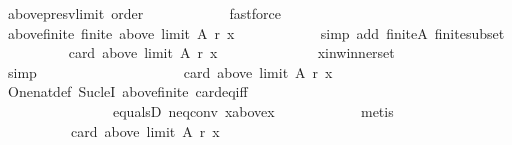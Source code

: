 \begin{isabellebody}
\ above{\isacharunderscore}{\kern0pt}presv{\isacharunderscore}{\kern0pt}limit\ order\isanewline
\ \ \ \ \ \ \ \ \ \ \isamarkupfalse%
\ fastforce\isanewline
\ \ \ \ \ \ \ \ \isamarkupfalse%
\ above{\isacharunderscore}{\kern0pt}finite{\isacharcolon}{\kern0pt}\ {\isachardoublequoteopen}finite\ {\isacharparenleft}{\kern0pt}above\ {\isacharparenleft}{\kern0pt}limit\ A\ r{\isacharparenright}{\kern0pt}\ x{\isacharparenright}{\kern0pt}{\isachardoublequoteclose}\isanewline
\ \ \ \ \ \ \ \ \ \ \isamarkupfalse%
\ {\isacharparenleft}{\kern0pt}simp\ add{\isacharcolon}{\kern0pt}\ finite{\isacharunderscore}{\kern0pt}A\ finite{\isacharunderscore}{\kern0pt}subset{\isacharparenright}{\kern0pt}\isanewline
\ \ \ \ \ \ \ \ \isamarkupfalse%
\ {\isachardoublequoteopen}card\ {\isacharparenleft}{\kern0pt}above\ {\isacharparenleft}{\kern0pt}limit\ A\ r{\isacharparenright}{\kern0pt}\ x{\isacharparenright}{\kern0pt}\ {\isasymle}\ {}{\isachardoublequoteclose}\isanewline
\ \ \ \ \ \ \ \ \ \ \isamarkupfalse%
\ x{\isacharunderscore}{\kern0pt}in{\isacharunderscore}{\kern0pt}winner{\isacharunderscore}{\kern0pt}set\isanewline
\ \ \ \ \ \ \ \ \ \ \isamarkupfalse%
\ simp\isanewline
\ \ \ \ \ \ \ \ \isamarkupfalse%
\ \isamarkupfalse%
\isanewline
\ \ \ \ \ \ \ \ \ \ {\isachardoublequoteopen}card\ {\isacharparenleft}{\kern0pt}above\ {\isacharparenleft}{\kern0pt}limit\ A\ r{\isacharparenright}{\kern0pt}\ x{\isacharparenright}{\kern0pt}\ {\isasymge}\ {}{\isachardoublequoteclose}\isanewline
\ \ \ \ \ \ \ \ \ \ \isamarkupfalse%
\ One{\isacharunderscore}{\kern0pt}nat{\isacharunderscore}{\kern0pt}def\ Suc{\isacharunderscore}{\kern0pt}leI\ above{\isacharunderscore}{\kern0pt}finite\ card{\isacharunderscore}{\kern0pt}eq{\isacharunderscore}{\kern0pt}{}{\isacharunderscore}{\kern0pt}iff\isanewline
\ \ \ \ \ \ \ \ \ \ \ \ \ \ \ \ equals{}D\ neq{}{\isacharunderscore}{\kern0pt}conv\ x{\isacharunderscore}{\kern0pt}above{\isacharunderscore}{\kern0pt}x\isanewline
\ \ \ \ \ \ \ \ \ \ \isamarkupfalse%
\ metis\isanewline
\ \ \ \ \ \ \ \ \isamarkupfalse%
\ \isamarkupfalse%
\isanewline
\ \ \ \ \ \ \ \ \ \ {\isachardoublequoteopen}card\ {\isacharparenleft}{\kern0pt}above\ {\isacharparenleft}{\kern0pt}limit\ A\ r{\isacharparenright}{\kern0pt}\ x{\isacharparenright}{\kern0pt}\ {\isacharequal}{\kern0pt}\ {}{\isachardoublequoteclose}\isanewline

\end{isabellebody}
